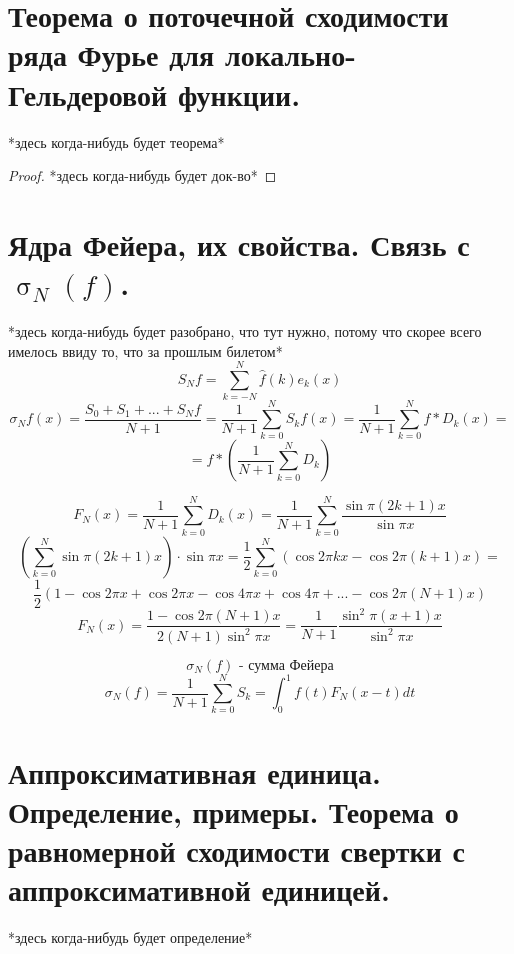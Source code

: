 \documentclass[matan]{subfiles}
\begin{document}
  \newpage
  \section{Теорема о поточечной сходимости ряда Фурье для локально-Гельдеровой функции.}
  \begin{theorem}
    *здесь когда-нибудь будет теорема*
  \end{theorem}

  \begin{proof}
    *здесь когда-нибудь будет док-во*
  \end{proof}

  \newpage
  \section{Ядра Фейера, их свойства. Связь с $\upsigma_N(f)$.}
  *здесь когда-нибудь будет разобрано, что тут нужно, потому что скорее всего имелось ввиду то, что за прошлым билетом*
  \[S_N f = \sum_{k = -N}^N \hat{f}(k)e_k(x) \]
  \[\sigma_N f(x) = \frac{S_0 + S_1 + ... + S_N f}{N + 1} = \frac{1}{N + 1}
  \sum_{k = 0}^N S_k f(x) = \frac{1}{N + 1} \sum_{k = 0}^N f * D_k(x) = \]
  \[= f * (\frac{1}{N  + 1}\sum_{k = 0}^N D_k)\]

  \begin{Definition} 
      \[F_N(x) = \frac{1}{N  + 1} \sum_{k = 0}^N D_k (x) = \frac{1}{N + 1}
      \sum_{k = 0}^N \frac{\sin \pi (2k + 1)x}{\sin \pi x} \]
      \[(\sum_{k = 0}^N \sin \pi (2k + 1)x) \cdot \sin \pi x = \frac{1}{2}
      \sum_{k = 0}^N (\cos 2\pi kx - \cos 2\pi (k + 1)x) =  \]
      \[\frac{1}{2} ( 1 - \cos 2\pi x + \cos 2\pi x - \cos 4\pi x + \cos 4 \pi + ... -
      \cos 2\pi (N + 1)x)\]
      \[F_N(x) = \frac{1 - \cos 2\pi(N + 1)x}{2(N + 1)\sin^2 \pi x} =
      \frac{1}{N + 1} \frac{\sin^2 \pi (x + 1)x}{\sin^2 \pi x}\]
  \end{Definition}

  \[\sigma_N(f) \text{ - сумма Фейера}\]
  \[
      \sigma_N(f) = \frac{1}{N + 1} \sum_{k = 0}^N S_k = \int_0^1 f(t) F_{N} (x-t)dt
  \]

  \newpage
  \section{Аппроксимативная единица. Определение, примеры. Теорема о равномерной сходимости свертки с аппроксимативной единицей.}
  \begin{definition}
    *здесь когда-нибудь будет определение*
  \end{definition}
\end{document}
